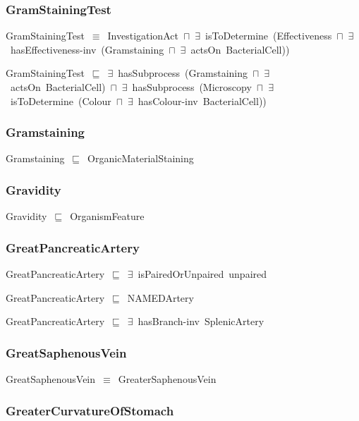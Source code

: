 \documentclass{article}
\begin{document}
\subsubsection*{GramStainingTest}

GramStainingTest~\ensuremath{\equiv}~InvestigationAct~\ensuremath{\sqcap}~\ensuremath{\exists}~isToDetermine~(Effectiveness~\ensuremath{\sqcap}~\ensuremath{\exists}~hasEffectiveness-inv~(Gramstaining~\ensuremath{\sqcap}~\ensuremath{\exists}~actsOn~BacterialCell))

GramStainingTest~\ensuremath{\sqsubseteq}~\ensuremath{\exists}~hasSubprocess~(Gramstaining~\ensuremath{\sqcap}~\ensuremath{\exists}~actsOn~BacterialCell)~\ensuremath{\sqcap}~\ensuremath{\exists}~hasSubprocess~(Microscopy~\ensuremath{\sqcap}~\ensuremath{\exists}~isToDetermine~(Colour~\ensuremath{\sqcap}~\ensuremath{\exists}~hasColour-inv~BacterialCell))~

\subsubsection*{Gramstaining}

Gramstaining~\ensuremath{\sqsubseteq}~OrganicMaterialStaining~

\subsubsection*{Gravidity}

Gravidity~\ensuremath{\sqsubseteq}~OrganismFeature~

\subsubsection*{GreatPancreaticArtery}

GreatPancreaticArtery~\ensuremath{\sqsubseteq}~\ensuremath{\exists}~isPairedOrUnpaired~unpaired~

GreatPancreaticArtery~\ensuremath{\sqsubseteq}~NAMEDArtery~

GreatPancreaticArtery~\ensuremath{\sqsubseteq}~\ensuremath{\exists}~hasBranch-inv~SplenicArtery~

\subsubsection*{GreatSaphenousVein}

GreatSaphenousVein~\ensuremath{\equiv}~GreaterSaphenousVein

\subsubsection*{GreaterCurvatureOfStomach}
\end{document}
